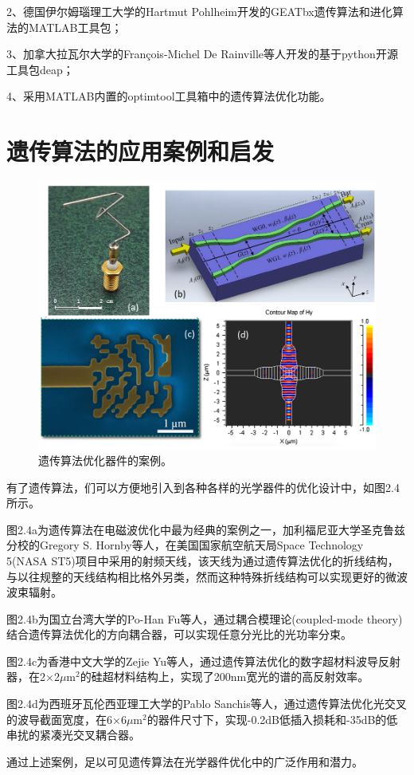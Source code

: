 2、德国伊尔姆瑙理工大学的Hartmut Pohlheim开发的GEATbx遗传算法和进化算法的MATLAB工具包；\cite{geatbx}

3、加拿大拉瓦尔大学的François-Michel De Rainville等人开发的基于python开源工具包deap；\cite{deap}

4、采用MATLAB内置的optimtool工具箱中的遗传算法优化功能。\cite{Matlab}



\section{遗传算法的应用案例和启发}
\begin{figure}[!htbp]
    \centering
    \includegraphics[width=1\textwidth]{Img/2-5.png}
    \caption{遗传算法优化器件的案例。}
    \label{fig:2-5}
\end{figure}



有了遗传算法，们可以方便地引入到各种各样的光学器件的优化设计中，如图2.4所示。

图2.4a为遗传算法在电磁波优化中最为经典的案例之一，加利福尼亚大学圣克鲁兹分校的Gregory S. Hornby等人，在美国国家航空航天局Space Technology 5(NASA ST5)项目中采用的射频天线，该天线为通过遗传算法优化的折线结构，与以往规整的天线结构相比格外另类，然而这种特殊折线结构可以实现更好的微波波束辐射。\cite{Hornby2010Automated}

图2.4b为国立台湾大学的Po-Han Fu等人，通过耦合模理论(coupled-mode theory)结合遗传算法优化的方向耦合器，可以实现任意分光比的光功率分束。\cite{Fu2016Broadband}

图2.4c为香港中文大学的Zejie Yu等人，通过遗传算法优化的数字超材料波导反射器，在2×2$\mu$m$^2$的硅超材料结构上，实现了200nm宽光的谱的高反射效率。\cite{Zejie2017Genetically}

图2.4d为西班牙瓦伦西亚理工大学的Pablo Sanchis等人，通过遗传算法优化光交叉的波导截面宽度，在6×6$\mu$m$^2$的器件尺寸下，实现-0.2dB低插入损耗和-35dB的低串扰的紧凑光交叉耦合器。\cite{Pablo2009Highly}

通过上述案例，足以可见遗传算法在光学器件优化中的广泛作用和潜力。\cite{Sanchis2004Integrated,Jyun2014Genetic}



